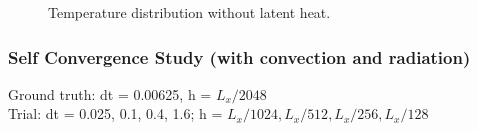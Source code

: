\documentclass[a4paper,12pt]{article}
\begin{document}
\begin{figure}[!ht]
     \hfill
     \caption{Temperature distribution without latent heat.}
     \label{fig:nolatent}
   \end{figure}

\subsubsection{Self Convergence Study (with convection and radiation)}

Ground truth: dt = 0.00625, h = $ L_x/2048 $\\
Trial: dt = 0.025, 0.1, 0.4, 1.6; h =  $ L_x/1024, L_x/512, L_x/256, L_x/128 $
\end{document}
